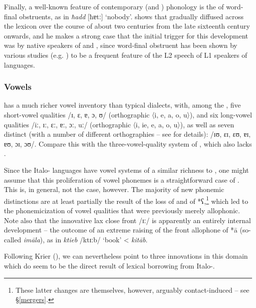 \documentclass[output=paper]{langsci/langscibook}
\begin{document}
Finally, a well-known feature of contemporary  (and  ) phonology is the  of word-final obstruents, as in \textit{ħadd} [ħɐtː] `nobody'. \cite{Avram2017devoicing} shows that  gradually diffused across the  lexicon over the course  of about two centuries from the late sixteenth century onwards, and he makes a strong case that the initial trigger for this development was  by native speakers of  and , since  word-final obstruent  has been shown by various studies (e.g. \citealt{Flegemunromackay1995}) to be a frequent feature of the L2 speech of L1 speakers of  languages.

\subsubsection{Vowels} %

 has a much richer vowel  inventory than typical   dialects, with, among the , five short-vowel qualities /ɪ, ɛ, ɐ, ɔ, ʊ/ (orthographic 〈i, e, a, o, u〉), and six long-vowel qualities /iː, ɪː, ɛː, ɐː, ɔː, uː/ (orthographic 〈i, ie, e, a, o, u〉), as well as seven distinct  (with a number of different orthographies -- see \citealt[299]{BorgAzzopardi-Alexander1997} for details): /ɪʊ, ɛɪ, ɛʊ, ɐɪ, ɐʊ, ɔɪ, ɔʊ/. Compare this with the three-vowel-quality system of  , which also lacks  \citep{Gibson2011}.


Since the Italo- languages have vowel systems of a similar richness to , one might assume that this proliferation of vowel phonemes is a straightforward case of . This is, in general, not the case, however. The majority of new phonemic distinctions are at least partially the result of the loss of  and of *ʕ,\footnote{These latter changes are themselves, however, arguably contact-induced -- see §\ref{mergers}.} which led to the phonemicization of vowel qualities that were previously merely allophonic. Note also that the innovative lax close front  /ɪː/ is apparently an entirely internal development -- the outcome of an extreme raising of the front allophone of *\={a} (so-called \textit{im\={a}la}), as in \textit{ktieb} /ktɪːb/ `book' < \textit{kit\={a}b}.

Following Krier (\citeyear[21--22]{krier1976}), we can nevertheless point to three innovations in this domain which do seem to be the direct result of lexical borrowing from Italo-.
\end{document}

